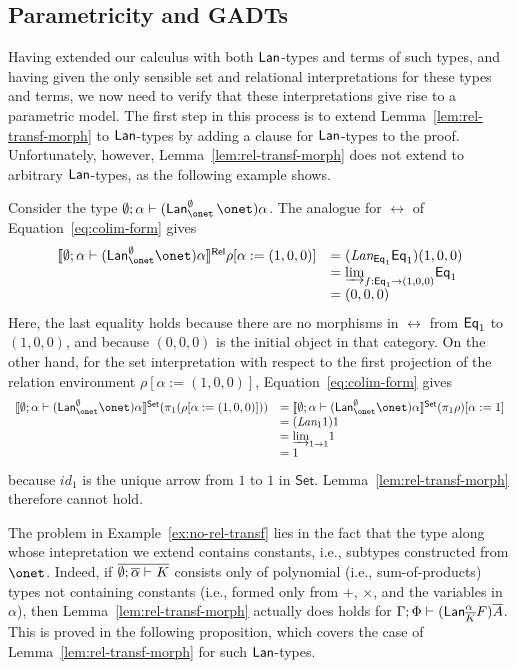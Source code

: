 \documentclass{lmcs}
\theoremstyle{plain}\newtheorem{satz}[thm]{Satz}
\newcommand{\set}{\mathsf{Set}}
\renewcommand{\id}{\mathit{id}}
\begin{document}
{\subsection{Parametricity and GADTs}

Having extended our calculus with both $\mathsf{Lan}$-types and terms of such
types, and having given the only sensible set and relational
interpretations for these types and terms, we now need to verify that
these interpretations give rise to a parametric model. The first step
in this process is to extend Lemma~\ref{lem:rel-transf-morph} to
$\mathsf{Lan}$-types by adding a clause for $\mathsf{Lan}$-types to the proof.
Unfortunately, however, Lemma~\ref{lem:rel-transf-morph} does not
extend to arbitrary $\mathsf{Lan}$-types, as the following example shows.

\begin{exa}\label{ex:no-rel-transf}
Consider the type $\emptyset; \alpha \vdash
(\Lan^{\emptyset}_{\onet}\, \onet) \alpha$. The analogue for $\rel$ of
Equation~\ref{eq:colim-form} gives
\[
\begin{array}{rl}
\relsem{ \emptyset; \alpha \vdash (\Lan^{\emptyset}_{\onet} \onet)
  \alpha } \rho [\alpha := (1, 0, 0)] 
&= (\textit{Lan}_{\Eq_1} \Eq_1)(1, 0, 0) \\
&= \colim{f : \Eq_1 \to (1, 0, 0)}{\Eq_1} \\
&= (0, 0, 0)
\end{array}
\]
Here, the last equality holds because there are no morphisms in $\rel$
from $\mathsf{Eq}_1$ to $(1, 0, 0)$, and because $(0,0,0)$ is the initial
object in that category. On the other hand, for the set interpretation
with respect to the first projection of the relation environment
$\rho[\alpha := (1,0,0)]$, Equation~\ref{eq:colim-form} gives
\[
\begin{array}{rl}
\setsem{ \emptyset; \alpha \vdash (\Lan^{\emptyset}_{\onet} \onet)
  \alpha } ( \pi_1 ( \rho [\alpha := (1, 0, 0)] ) ) 
&= \setsem{ \emptyset; \alpha \vdash (\Lan^{\emptyset}_{\onet} \onet)
  \alpha } (\pi_1 \rho) [\alpha := 1] \\ 
&= (\textit{Lan}_{1} 1) 1 \\
&= \colim{1 \to 1}{1} \\
&= 1
\end{array}
\]
because $\id_1$ is the unique arrow from $1$ to $1$ in $\set$.
Lemma~\ref{lem:rel-transf-morph} therefore cannot hold.
\end{exa}

The problem in Example~\ref{ex:no-rel-transf} lies in the fact that
the type along whose intepretation we extend contains constants, i.e.,
subtypes constructed from $\onet$. Indeed, if $\overline{\emptyset;
  \overline{\alpha} \vdash K}$ consists only of polynomial (i.e.,
sum-of-products) types not containing constants (i.e., formed only
from $+$, $\times$, and the variables in $\alpha$), then
Lemma~\ref{lem:rel-transf-morph} actually does holds for $\Gamma; \Phi
\vdash (\mathsf{Lan}^{\alpha}_{\overline{K}} F)\overline{A}$. This is proved in the
following proposition, which covers the case of
Lemma~\ref{lem:rel-transf-morph} for such $\mathsf{Lan}$-types.

}
\end{document}
